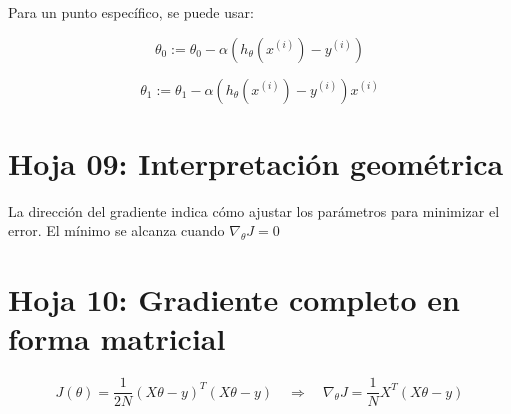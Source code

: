 \documentclass[12pt]{article}
\begin{document}
Para un punto específico, se puede usar:

\[
\theta_0 := \theta_0 - \alpha (h_\theta(x^{(i)}) - y^{(i)})
\]

\[
\theta_1 := \theta_1 - \alpha (h_\theta(x^{(i)}) - y^{(i)}) x^{(i)}
\]

\section*{Hoja 09: Interpretación geométrica}

La dirección del gradiente indica cómo ajustar los parámetros para minimizar el error. El mínimo se alcanza cuando \( \nabla_\theta J = 0 \)

\section*{Hoja 10: Gradiente completo en forma matricial}

\[
J(\theta) = \frac{1}{2N} (X\theta - y)^T (X\theta - y)
\quad \Rightarrow \quad \nabla_\theta J = \frac{1}{N} X^T (X\theta - y)
\]
\end{document}
